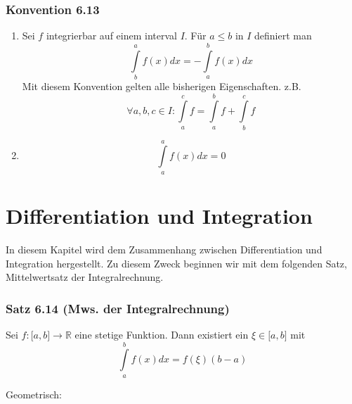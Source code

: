 \subsubsection*{Konvention 6.13}
\begin{enumerate}[1)]
\item Sei $f$ integrierbar auf einem interval $I$. Für $a\leq b$ in $I$ definiert man \[\int\limits_b^a {f(x)dx =  - \int\limits_a^b {f(x)dx} } \]
Mit diesem Konvention gelten alle bisherigen Eigenschaften. z.B. \[\forall a,b,c \in I:\int\limits_a^c f  = \int\limits_a^b f  + \int\limits_b^c f \]
\item \[\int\limits_a^a {f(x)dx = 0} \]
\end{enumerate}
\section{Differentiation und Integration}
In diesem Kapitel wird dem Zusammenhang zwischen Differentiation und Integration hergestellt. Zu diesem Zweck beginnen wir mit dem folgenden Satz, Mittelwertsatz der Integralrechnung. \\

\subsubsection*{Satz 6.14 (Mws. der Integralrechnung)}
Sei $f:\lbrack a,b\rbrack\rightarrow\mathbb{R}$ eine stetige Funktion. Dann existiert ein $\xi\in\lbrack a,b\rbrack$ mit \[\int\limits_a^b {f(x)dx = f(\xi )(b - a)} \] 

Geometrisch:

